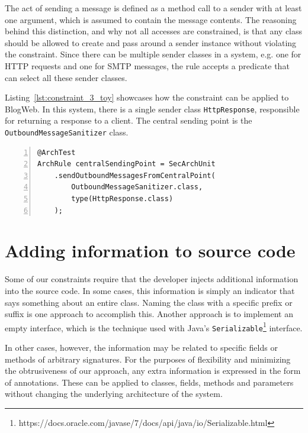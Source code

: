 The act of sending a message is defined as a method call to a sender with at least one argument, which is assumed to contain the message contents. The reasoning behind this distinction, and why not all accesses are constrained, is that any class should be allowed to create and pass around a sender instance without violating the constraint.
Since there can be multiple sender classes in a system, e.g. one for HTTP requests and one for SMTP messages, the rule accepts a predicate that can select all these sender classes.

Listing~\ref{lst:constraint_3_toy} showcases how the constraint can be applied to BlogWeb. In this system, there is a single sender class \texttt{HttpResponse}, responsible for returning a response to a client. The central sending point is the \texttt{OutboundMessageSanitizer} class. 

\begin{minipage}{\linewidth}
\begin{lstlisting}[caption={Application of constraint 3 to BlogWeb.}, captionpos=b, label=lst:constraint_3_toy, numbers=left]
@ArchTest
ArchRule centralSendingPoint = SecArchUnit
    .sendOutboundMessagesFromCentralPoint(
        OutboundMessageSanitizer.class,
        type(HttpResponse.class)
    );
\end{lstlisting}
\end{minipage}




\section{Adding information to source code}

Some of our constraints require that the developer injects additional information into the source code. In some cases, this information is simply an indicator that says something about an entire class. Naming the class with a specific prefix or suffix is one approach to accomplish this. Another approach is to implement an empty interface, which is the technique used with Java's \texttt{Serializable}\footnote{https://docs.oracle.com/javase/7/docs/api/java/io/Serializable.html} interface. 

In other cases, however, the information may be related to specific fields or methods of arbitrary signatures. For the purposes of flexibility and minimizing the obtrusiveness of our approach, any extra information is expressed in the form of annotations. These can be applied to classes, fields, methods and parameters without changing the underlying architecture of the system.

